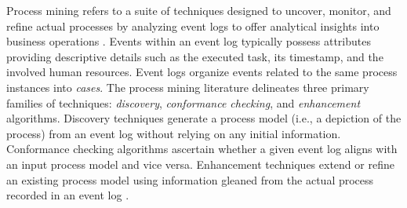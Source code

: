 \begin{newj}



Process mining refers to a suite of techniques designed to uncover, monitor, and refine actual processes by analyzing event logs to offer analytical insights into business operations \cite{van2012process}. Events within an event log typically possess attributes providing descriptive details such as the executed task, its timestamp, and the involved human resources. Event logs organize events related to the same process instances into \emph{cases}. The process mining literature delineates three primary families of techniques: \emph{discovery}, \emph{conformance checking}, and \emph{enhancement} algorithms. Discovery techniques generate a process model (i.e., a depiction of the process) from an event log without relying on any initial information. Conformance checking algorithms ascertain whether a given event log aligns with an input process model and vice versa. Enhancement techniques extend or refine an existing process model using information gleaned from the actual process recorded in an event log \cite{DBLP:journals/tmis/Aalst12}.


\end{newj}
